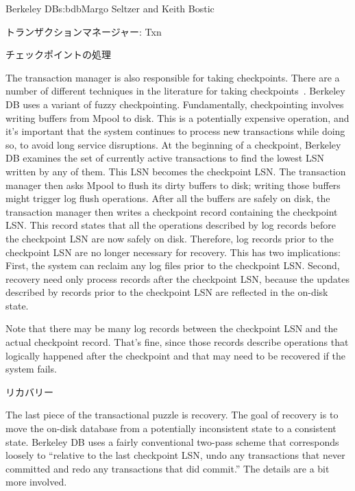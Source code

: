 \begin{aosachapter}{Berkeley DB}{s:bdb}{Margo Seltzer and Keith Bostic}
\begin{aosasect1}{トランザクションマネージャー: Txn}
\begin{aosasect2}{チェックポイントの処理}


The transaction manager is also responsible for taking checkpoints.
There are a number of different techniques in the literature for
taking checkpoints~\cite{bib:haerder:recovery}. Berkeley DB uses a
variant of fuzzy checkpointing.  Fundamentally, checkpointing involves
writing buffers from Mpool to disk. This is a potentially expensive
operation, and it's important that the system continues to process new
transactions while doing so, to avoid long service disruptions. At the
beginning of a checkpoint, Berkeley DB examines the set of currently
active transactions to find the lowest LSN written by any of
them. This LSN becomes the checkpoint LSN\@. The transaction manager
then asks Mpool to flush its dirty buffers to disk; writing those
buffers might trigger log flush operations. After all the buffers are
safely on disk, the transaction manager then writes a checkpoint
record containing the checkpoint LSN\@.  This record states that all the
operations described by log records before the checkpoint LSN are now
safely on disk.  Therefore, log records prior to the checkpoint LSN
are no longer necessary for recovery. This has two implications:
First, the system can reclaim any log files prior to the checkpoint
LSN\@. Second, recovery need only process records after the checkpoint
LSN, because the updates described by records prior to the checkpoint
LSN are reflected in the on-disk state.

Note that there may be many log records between the checkpoint LSN and
the actual checkpoint record.  That's fine, since those records describe
operations that logically happened after the checkpoint and that may
need to be recovered if the system fails.

\end{aosasect2}

\begin{aosasect2}{リカバリー}

The last piece of the transactional puzzle is recovery. The goal of
recovery is to move the on-disk database from a potentially
inconsistent state to a consistent state. Berkeley DB uses a fairly
conventional two-pass scheme that corresponds loosely to ``relative to
the last checkpoint LSN, undo any transactions that never committed
and redo any transactions that did commit.'' The details are a bit
more involved.


\end{aosasect2}
\end{aosasect1}
\end{aosachapter}
